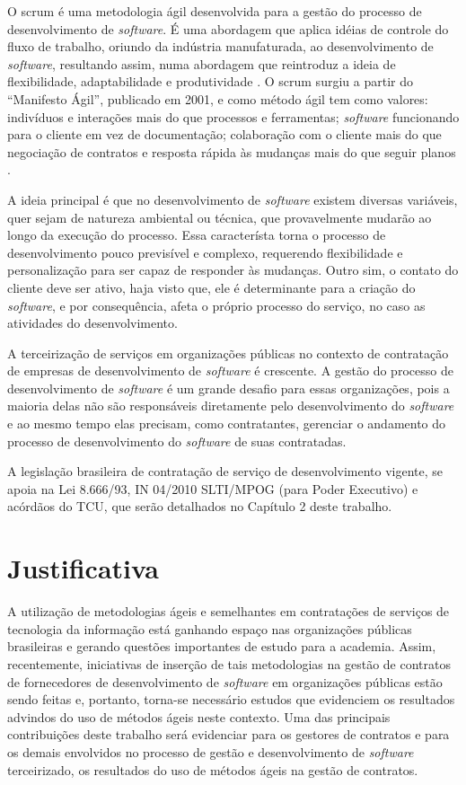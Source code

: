 O scrum é uma metodologia ágil desenvolvida para a gestão do processo de desenvolvimento de \textit{software}. É uma abordagem que aplica idéias de controle do fluxo de trabalho, oriundo da indústria manufaturada, ao desenvolvimento de \textit{software}, resultando assim, numa abordagem que reintroduz a ideia de flexibilidade, adaptabilidade e produtividade \cite{porto}. O scrum surgiu a partir do “Manifesto Ágil”, publicado em 2001, e como método ágil tem como valores: indivíduos e interações mais do que processos e ferramentas; \textit{software} funcionando para o cliente em vez de documentação; colaboração com o cliente mais do que negociação de contratos e resposta rápida às mudanças mais do que seguir planos \cite{manifesto}. 

A ideia principal é que no desenvolvimento de \textit{software} existem diversas variáveis, quer sejam de natureza ambiental ou técnica, que provavelmente mudarão ao longo da execução do processo. Essa característa torna o processo de desenvolvimento pouco previsível e complexo, requerendo flexibilidade e personalização para ser capaz de responder às mudanças. Outro sim, o contato do cliente deve ser ativo, haja visto que, ele é determinante para a criação do \textit{software}, e por consequência, afeta o próprio processo do serviço, no caso as atividades do desenvolvimento.

A terceirização de serviços em organizações públicas no contexto de contratação de empresas de desenvolvimento de \textit{software} é crescente. A gestão do processo de desenvolvimento de \textit{software} é um grande desafio para essas organizações, pois a maioria delas não são responsáveis diretamente pelo desenvolvimento do \textit{software} e ao mesmo tempo elas precisam, como contratantes, gerenciar o andamento do processo de desenvolvimento do \textit{software} de suas contratadas. 

A legislação brasileira de contratação de serviço de desenvolvimento vigente, se apoia na Lei 8.666/93, IN 04/2010 SLTI/MPOG (para Poder Executivo) e acórdãos do TCU, que serão detalhados no Capítulo 2 deste trabalho. 



\section[Justificativa]{Justificativa}

A utilização de metodologias ágeis e semelhantes em contratações de serviços de tecnologia da informação está ganhando espaço nas organizações públicas brasileiras e gerando questões importantes de estudo para a academia. Assim, recentemente, iniciativas de inserção de tais metodologias na gestão de contratos de fornecedores de desenvolvimento de \textit{software} em organizações públicas estão sendo feitas e, portanto, torna-se necessário estudos que evidenciem os resultados advindos do uso de métodos ágeis neste contexto. Uma das principais contribuições deste trabalho será evidenciar para os gestores de contratos e para os demais envolvidos no processo de gestão e desenvolvimento de \textit{software} terceirizado, os resultados do uso de métodos ágeis na gestão de contratos. 

